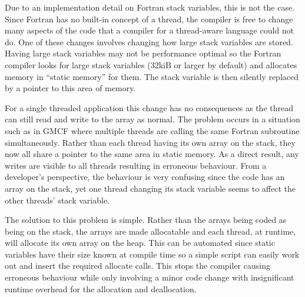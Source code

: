 Due to an implementation detail on Fortran stack variables, this is not the
case. Since Fortran has no built-in concept of a thread, the compiler is free to
change many aspects of the code that a compiler for a thread-aware language
could not do. One of these changes involves changing how large stack variables
are stored. Having large stack variables may not be performance optimal so the
Fortran compiler looks for large stack variables (32kiB or larger by default)
and allocates memory in ``static memory'' for them. The stack variable is then
silently replaced by a pointer to this area of memory.

For a single threaded application this change has no consequences as the thread
can still read and write to the array as normal. The problem occurs in a
situation such as in GMCF where multiple threads are calling the same Fortran
subroutine simultaneously. Rather than each thread having its own array on the
stack, they now all share a pointer to the same area in static memory. As a
direct result, any writes are visible to all threads resulting in erroneous
behaviour. From a developer's perspective, the behaviour is very confusing since
the code has an array on the stack, yet one thread changing its stack variable
seems to affect the other threads' stack variable.

The solution to this problem is simple. Rather than the arrays being coded as
being on the stack, the arrays are made allocatable and each thread, at runtime,
will allocate its own array on the heap. This can be automated since static
variables have their size known at compile time so a simple script can easily
work out and insert the required allocate calls. This stops the compiler causing
erroneous behaviour while only involving a minor code change with insignificant
runtime overhead for the allocation and deallocation.
